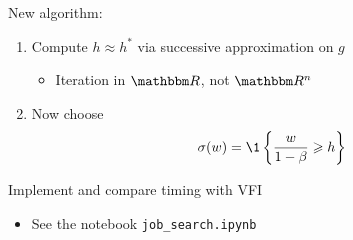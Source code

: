 \begin{frame}
    
    New algorithm:

    \begin{enumerate}
        \item Compute $h \approx h^*$ via successive approximation on $g$
            \vspace{1em}
            \begin{itemize}
                \item Iteration in $\RR$, not $\RR^n$
            \end{itemize}
            \vspace{1em}
        \item Now choose
            \begin{equation*}
                \sigma(w)
                = \1
                \left\{
                    \frac{w}{1-\beta}
                    \geq
                    h
                \right\}
            \end{equation*}
    \end{enumerate}


            \vspace{1em}
            \vspace{1em}
    \Ex Implement and compare timing with VFI
            \vspace{1em}


    \begin{itemize}
        \item See the notebook \texttt{job\_search.ipynb}
    \end{itemize}

\end{frame}
















